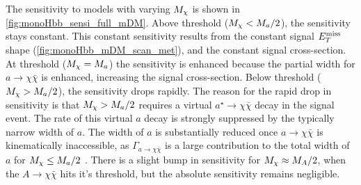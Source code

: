 The sensitivity to models with varying $M_{\chi}$ is shown in  \autoref{fig:monoHbb_sensi_full_mDM}.
Above threshold ($M_{\chi} < M_{a}/2$), the sensitivity stays constant. 
This constant sensitivity results from the constant  signal $E_T^\mathrm{miss}$ shape (\autoref{fig:monoHbb_mDM_scan_met}), and the constant signal cross-section.
At threshold ($M_{\chi} = M_{a}$) the sensitivity is enhanced because the partial width for $ a \rightarrow \chi \bar{\chi} $ is enhanced, 
increasing the signal cross-section.
Below threshold ($M_{\chi} > M_{a}/2$), the sensitivity drops rapidly. 
The reason for the rapid drop in sensitivity is that $M_{\chi} > M_{a}/2$ requires a virtual $a^{\star} \rightarrow \chi\bar{\chi}$ decay in the  signal event. 
The rate of this virtual $a$ decay is strongly suppressed by the typically  narrow width of  $a$. 
The width of $a$ is substantially reduced once $a\rightarrow \chi \bar{\chi}$ is kinematically inaccessible, 
as $\Gamma_{a\rightarrow \chi \bar{\chi}}$ is a large contribution to the total width of $a$ for $M_{\chi} \leq M_{a}/2$ \cite{Bauer:2017ota}.
There is a slight bump in sensitivity for $M_{\chi} \approx M_{A}/2$, when the $A\rightarrow \chi\bar{\chi}$ hits it's threshold,
but the absolute sensitivity remains negligible.